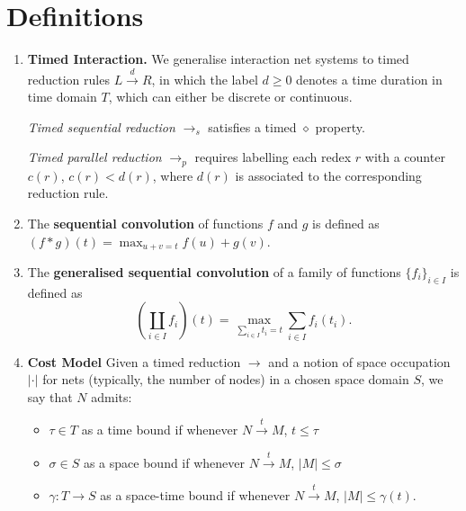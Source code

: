 \documentclass{fit-teorsem}
\begin{document}
\section*{Definitions}
\begin{enumerate}
\item \textbf{Timed Interaction.} We generalise interaction net systems to timed reduction rules
	$L \stackrel{d}{\longrightarrow} R$, in which the label $d \ge 0$ denotes a time duration
	in time domain $T$, which can either be discrete or continuous.

	\textit{Timed sequential reduction} $\longrightarrow_s$ satisfies a timed $\diamond$ property.

	\textit{Timed parallel reduction} $\longrightarrow_p$ requires labelling each redex $r$ with
	a counter $c(r)$, $c(r) < d(r)$, where $d(r)$ is associated to the corresponding reduction rule.

\item The \textbf{sequential convolution} of functions $f$ and $g$ is defined as
	$(f \ast g)(t) = \max_{u + v = t} f(u) + g(v)$.

\item The \textbf{generalised sequential convolution} of a family of functions $\{f_i\}_{i \in I}$ is
	defined as \[
		\left(\coprod_{i \in I} f_i\right)(t) = \max_{\sum_{i \in I} t_i = t} \sum_{i \in I} f_i(t_i)
	.\]

\item \textbf{Cost Model} Given a timed reduction $\longrightarrow$ and a notion of space
	occupation $|\cdot|$ for nets (typically, the number of nodes) in a chosen
	space domain $S$, we say that $N$ admits:
	\begin{itemize}
		\item $\tau \in T$ as a time bound if whenever
			$N \stackrel{t}{\longrightarrow} M$, $t \le \tau$
		\item $\sigma \in S$ as a space bound if whenever
			$N \stackrel{t}{\longrightarrow} M$, $|M| \le \sigma$
		\item $\gamma : T \to S$ as a space-time bound if whenever
			$N \stackrel{t}{\longrightarrow} M$, $|M| \le \gamma(t).$
	\end{itemize}
\end{enumerate}
\end{document}
